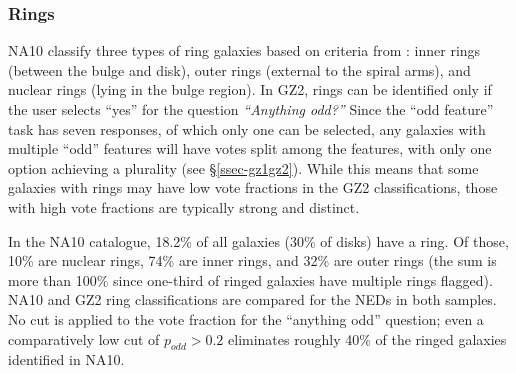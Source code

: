 \documentclass[useAMS,usenatbib]{mn2e}
\begin{document}

\subsubsection{Rings}

NA10 classify three types of ring galaxies based on criteria from \citet{but96}: inner rings (between the bulge and disk), outer rings (external to the spiral arms), and nuclear rings (lying in the bulge region). In GZ2, rings can be identified only if the user selects ``yes'' for the question {\it ``Anything odd?''} Since the ``odd feature'' task has seven responses, of which only one can be selected, any galaxies with multiple ``odd'' features will have votes split among the features, with only one option achieving a plurality (see \S\ref{ssec-gz1gz2}). While this means that some galaxies with rings may have low vote fractions in the GZ2 classifications, those with high vote fractions are typically strong and distinct.

In the NA10 catalogue, 18.2\% of all galaxies (30\% of disks) have a ring. Of those, 10\% are nuclear rings, 74\% are inner rings, and 32\% are outer rings (the sum is more than 100\% since one-third of ringed galaxies have multiple rings flagged). NA10 and GZ2 ring classifications are compared for the NEDs in both samples. No cut is applied to the vote fraction for the ``anything odd'' question; even a comparatively low cut of $p_{odd}>0.2$ eliminates roughly 40\% of the ringed galaxies identified in NA10. %
\end{document}
